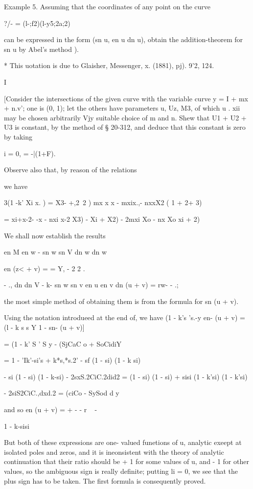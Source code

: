 Example 5. Assuming that the coordinates of any point on the curve

?/- = (l-;f2)(l-y5;2a;2)

can be expressed in the form (sn u, en u dn u), obtain the
addition-theorem for sn u by Abel's method ).

* This uotation is due to Glaisher, Messenger, x. (1881), pj). 9'2,
124.

I

%
%

[Consider the intersections of the given curve with the variable curve
y = I + mx + n.v'; one is (0, 1); let the others have parameters u,
Uz, M3, of which u . xii may be chosen arbitrarily Vjy suitable choice
of m and n. Shew that U1 + U2 + U3 is constant, by the method of §
20-312, and deduce that this constant is zero by taking

 i = 0, = -|(1+F).

Observe also that, by reason of the relations

we have

 3(1 -k' Xi x. ) = X3- +,2\ 2 ) mx x x - mxix.,- nxxX2 ( 1 + 2+ 3)

= xi+x-2- -x - nxi x-2 X3) - Xi + X2) - 2mxi Xo - nx Xo xi + 2)

We shall now establish
the results

en M en w - sn w sn V dn w dn w

en (z< + v) = = Y, - 2 2 .

- ., dn dn V - k- sn w sn v en u en v dn (u + v) = rw- - .;

the most simple method of obtaining them is from the formula for sn (u
+ v).

Using the notation introdueed at the end of, we have (1 - k's
's.-y en- (u + v) = (l - k s s Y 1 - sn- (u + v)]

= (1 - k' S ' S y - (SjCaC o + SoCidiY

= 1 - 'Ik'-si's + k*s,*s.2' - sf (1 - si) (1 - k si)

- si (1 - si) (1 - k-si) - 2sxS.2CiC.2did2 = (1 - si) (1 - si) + sisi
(1 - k'si) (1 - k'si)

- 2siS2CiC.,dxd.2 = (ciCo - SySod d y

and so en (u + v) = + - - r ~ - 

 1 - k-sisi

But both of these expressions are one- valued funetions of u, analytic
exeept at isolated poles and zeros, and it is ineonsistent with the
theory of analytic continuation that their ratio should be + 1 for
some values of u, and - 1 for other values, so the ambiguous sign is
really definite; putting li = 0, we see that the plus sign has to be
taken. The first formula is consequently proved.

